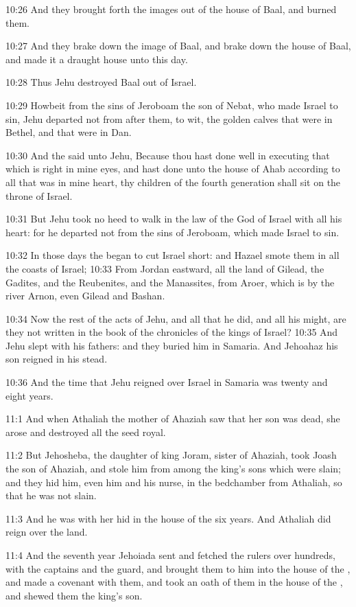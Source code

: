 10:26 And they brought forth the images out of the house of Baal, and
burned them.

10:27 And they brake down the image of Baal, and brake down the house
of Baal, and made it a draught house unto this day.

10:28 Thus Jehu destroyed Baal out of Israel.

10:29 Howbeit from the sins of Jeroboam the son of Nebat, who made
Israel to sin, Jehu departed not from after them, to wit, the golden
calves that were in Bethel, and that were in Dan.

10:30 And the \LORD said unto Jehu, Because thou hast done well in
executing that which is right in mine eyes, and hast done unto the
house of Ahab according to all that was in mine heart, thy children of
the fourth generation shall sit on the throne of Israel.

10:31 But Jehu took no heed to walk in the law of the \LORD God of
Israel with all his heart: for he departed not from the sins of
Jeroboam, which made Israel to sin.

10:32 In those days the \LORD began to cut Israel short: and Hazael
smote them in all the coasts of Israel; 10:33 From Jordan eastward,
all the land of Gilead, the Gadites, and the Reubenites, and the
Manassites, from Aroer, which is by the river Arnon, even Gilead and
Bashan.

10:34 Now the rest of the acts of Jehu, and all that he did, and all
his might, are they not written in the book of the chronicles of the
kings of Israel?  10:35 And Jehu slept with his fathers: and they
buried him in Samaria. And Jehoahaz his son reigned in his stead.

10:36 And the time that Jehu reigned over Israel in Samaria was twenty
and eight years.

11:1 And when Athaliah the mother of Ahaziah saw that her son was
dead, she arose and destroyed all the seed royal.

11:2 But Jehosheba, the daughter of king Joram, sister of Ahaziah,
took Joash the son of Ahaziah, and stole him from among the king's
sons which were slain; and they hid him, even him and his nurse, in
the bedchamber from Athaliah, so that he was not slain.

11:3 And he was with her hid in the house of the \LORD six years. And
Athaliah did reign over the land.

11:4 And the seventh year Jehoiada sent and fetched the rulers over
hundreds, with the captains and the guard, and brought them to him
into the house of the \LORD, and made a covenant with them, and took an
oath of them in the house of the \LORD, and shewed them the king's son.

